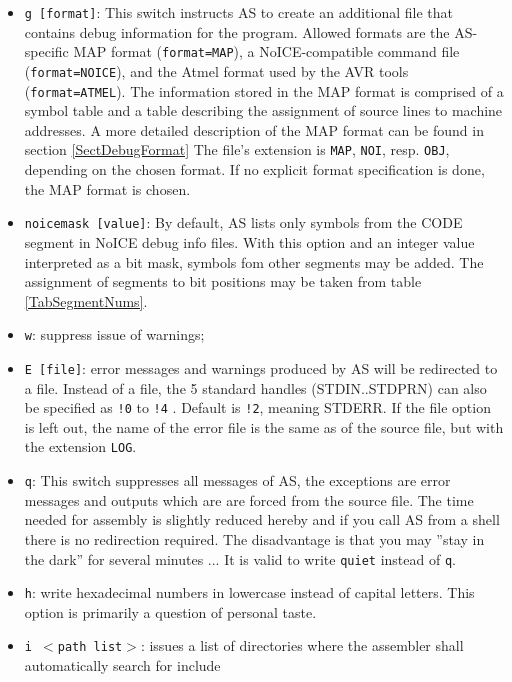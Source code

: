 \documentclass[12pt,twoside]{report}
\newcommand{\tty}[1]{{\tt #1}}
\begin{document}
\begin{itemize}
\item{\tty{g [format]}: This switch instructs AS to create an additional
      file that contains debug information for the program.  Allowed
      formats are the AS-specific MAP format ({\tt format=MAP}), a
      NoICE-compatible command file ({\tt format=NOICE}), and the Atmel
      format used by the AVR tools ({\tt format=ATMEL}). The information
      stored in the MAP format is comprised of a symbol table and a table
      describing the assignment of source lines to machine addresses.  A
      more detailed description of the MAP format can be found in section
      \ref{SectDebugFormat}  The file's extension is \tty{MAP}, \tty{NOI},
      resp. \tty{OBJ}, depending on the chosen format.  If no explicit
      format specification is done, the MAP format is chosen.}
\item{\tty{noicemask [value]}: By default, AS lists only symbols from the
      CODE segment in NoICE debug info files.  With this option and an
      integer value interpreted as a bit mask, symbols fom other segments
      may be added.  The assignment of segments to bit positions may
      be taken from table \ref{TabSegmentNums}.}
\item{\tty{w}: suppress issue of warnings;}
\item{\tty{E [file]}: error messages and warnings produced by AS will be 
      redirected to a file. Instead of a file, the 5 standard 
      handles (STDIN..STDPRN) can also be specified as 
      \tty{!0} to \tty{!4} . Default is \tty{!2}, meaning STDERR.  If the 
      file option is left out, the name of the error file 
      is the same as of the source file, but with the 
      extension \tty{LOG}.}
\item{\tty{q}: This switch suppresses all messages of AS, the exceptions are 
      error messages and outputs which are are forced from the 
      source file.  The time needed for assembly is slightly reduced 
      hereby and if you call AS from a shell there is no redirection 
      required.  The disadvantage is that you may ''stay in the dark'' 
      for several minutes ... It is valid to write \tty{quiet} instead
      of \tty{q}.}
\item{\tty{h}: write hexadecimal numbers in lowercase instead of capital
      letters. This option is primarily a question of personal
      taste.}
\item{\tty{i $<$path list$>$}: issues a list of directories where the 
      assembler shall automatically search for include 
}
\end{itemize}
\end{document}

